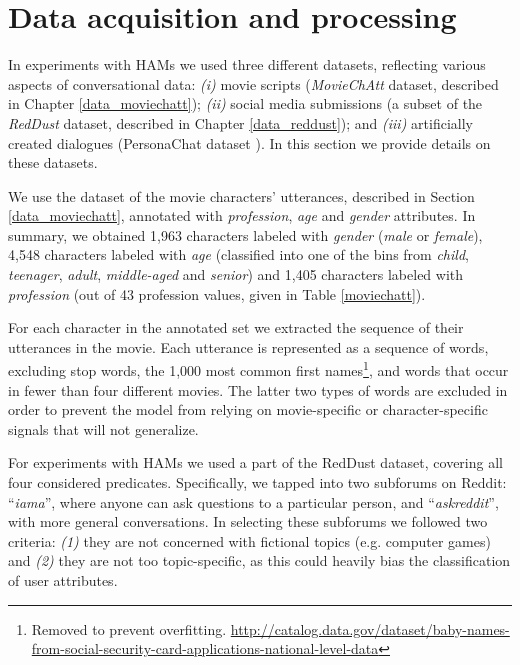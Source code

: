 \section{Data acquisition and processing}

In experiments with HAMs we used three different datasets, reflecting various aspects of conversational data: \textit{(i)} movie scripts (\textit{MovieChAtt} dataset, described in Chapter \ref{data_moviechatt}); \textit{(ii)} social media submissions (a subset of the \textit{RedDust} dataset, described in Chapter \ref{data_reddust}); and \textit{(iii)} artificially created dialogues (PersonaChat dataset \cite{zhang2018personalizing}). In this section we provide details on these datasets.

 We use the dataset of the movie characters' utterances, described in Section \ref{data_moviechatt}, annotated with \textit{profession}, \textit{age} and \textit{gender} attributes. In summary, we obtained 1,963 characters labeled with \textit{gender} (\textit{male} or \textit{female}), 4,548 characters labeled with \textit{age} (classified into one of the bins from \textit{child}, \textit{teenager}, \textit{adult}, \textit{middle-aged} and \textit{senior}) and 1,405 characters labeled with \textit{profession} (out of 43 profession values, given in Table \ref{moviechatt}).

For each character in the annotated set we extracted the sequence of their utterances in the movie.
Each utterance is represented as a sequence of words, excluding stop words, the 1,000 most common first names\footnote{Removed to prevent overfitting. \href{https://catalog.data.gov/dataset/baby-names-from-social-security-card-applications-national-level-data}{http://catalog.data.gov/dataset/baby-names-from-social-security-card-applications-national-level-data}}, and words that occur in fewer than four different movies.
The latter two types of words are excluded in order to prevent the model from relying on movie-specific or character-specific signals that will not generalize.

For experiments with HAMs we used a part of the RedDust dataset, covering all four considered predicates. Specifically, we tapped into two subforums on Reddit: ``\textit{iama}'', where anyone can ask questions to a particular person, 
and ``\textit{askreddit}'', with more general conversations. In selecting these subforums we followed two criteria: \textit{(1)} they are not concerned with fictional topics (e.g. computer games) and \textit{(2)} they are not too topic-specific, 
as this could heavily bias the classification of user attributes.

